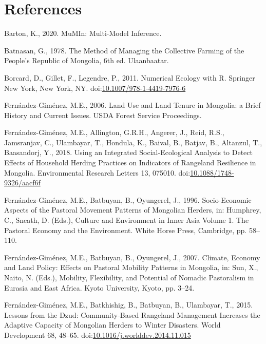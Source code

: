 \documentclass[]{elsarticle} %
\newlength{\cslhangindent}
\newenvironment{cslreferences}%
  {\setlength{\parindent}{0pt}%
  \everypar{\setlength{\hangindent}{\cslhangindent}}\ignorespaces}%
  {\par}
\begin{document}
\hypertarget{references}{%
\section*{References}\label{references}}

\hypertarget{refs}{}
\begin{cslreferences}
\leavevmode\hypertarget{ref-Barton.2020}{}%
Barton, K., 2020. MuMIn: Multi-Model Inference.

\leavevmode\hypertarget{ref-Batnasan.1978}{}%
Batnasan, G., 1978. The Method of Managing the Collective Farming of the
People's Republic of Mongolia, 6th ed. Ulaanbaatar.

\leavevmode\hypertarget{ref-Borcard.2011}{}%
Borcard, D., Gillet, F., Legendre, P., 2011. Numerical Ecology with R.
Springer New York, New York, NY.
doi:\href{https://doi.org/10.1007/978-1-4419-7976-6}{10.1007/978-1-4419-7976-6}

\leavevmode\hypertarget{ref-FernandezGimenez.2006}{}%
Fernández-Giménez, M.E., 2006. Land Use and Land Tenure in Mongolia: a
Brief History and Current Issues. USDA Forest Service Proceedings.

\leavevmode\hypertarget{ref-FernandezGimenez.2018}{}%
Fernández-Giménez, M.E., Allington, G.R.H., Angerer, J., Reid, R.S.,
Jamsranjav, C., Ulambayar, T., Hondula, K., Baival, B., Batjav, B.,
Altanzul, T., Baasandorj, Y., 2018. Using an Integrated
Social-Ecological Analysis to Detect Effects of Household Herding
Practices on Indicators of Rangeland Resilience in Mongolia.
Environmental Research Letters 13, 075010.
doi:\href{https://doi.org/10.1088/1748-9326/aacf6f}{10.1088/1748-9326/aacf6f}

\leavevmode\hypertarget{ref-FernandezGimenez.1996}{}%
Fernández-Giménez, M.E., Batbuyan, B., Oyungerel, J., 1996.
Socio-Economic Aspects of the Pastoral Movement Patterns of Mongolian
Herders, in: Humphrey, C., Sneath, D. (Eds.), Culture and Environment in
Inner Asia Volume 1. The Pastoral Economy and the Environment. White
Horse Press, Cambridge, pp. 58--110.

\leavevmode\hypertarget{ref-FernandezGimenez.2007}{}%
Fernández-Giménez, M.E., Batbuyan, B., Oyungerel, J., 2007. Climate,
Economy and Land Policy: Effects on Pastoral Mobility Patterns in
Mongolia, in: Sun, X., Naito, N. (Eds.), Mobility, Flexibility, and
Potential of Nomadic Pastoralism in Eurasia and East Africa. Kyoto
University, Kyoto, pp. 3--24.

\leavevmode\hypertarget{ref-FernandezGimenez.2015}{}%
Fernández-Giménez, M.E., Batkhishig, B., Batbuyan, B., Ulambayar, T.,
2015. Lessons from the Dzud: Community-Based Rangeland Management
Increases the Adaptive Capacity of Mongolian Herders to Winter
Disasters. World Development 68, 48--65.
doi:\href{https://doi.org/10.1016/j.worlddev.2014.11.015}{10.1016/j.worlddev.2014.11.015}


\end{cslreferences}
\end{document}
